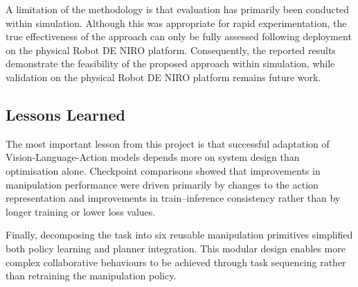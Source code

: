 \documentclass[conference, 12pt]{IEEEtran}
\begin{document}
A limitation of the methodology is that evaluation has primarily been conducted within simulation. Although this was appropriate for rapid experimentation, the true effectiveness of the approach can only be fully assessed following deployment on the physical Robot DE NIRO platform. Consequently, the reported results demonstrate the feasibility of the proposed approach within simulation, while validation on the physical Robot DE NIRO platform remains future work.

\subsection{Lessons Learned}

The most important lesson from this project is that successful adaptation of Vision-Language-Action models depends more on system design than optimisation alone. Checkpoint comparisons showed that improvements in manipulation performance were driven primarily by changes to the action representation and improvements in train--inference consistency rather than by longer training or lower loss values.

Finally, decomposing the task into six reusable manipulation primitives simplified both policy learning and planner integration. This modular design enables more complex collaborative behaviours to be achieved through task sequencing rather than retraining the manipulation policy.
\end{document}

